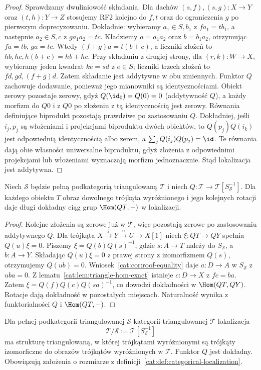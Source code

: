 \begin{proof}
Sprawdzamy dwuliniowość składania. Dla dachów $(s,f),(s,g):X\to Y$ oraz $(t,h):Y\to Z$ stosujemy RF2 kolejno do $f,t$ oraz do ograniczenia $g$ po pierwszym doprecyzowaniu. Dokładnie: wybieramy $a_1\in S,b_1$ z $fa_1=tb_1$, a następnie $a_2\in S,c$ z $ga_1a_2=tc$. Kładziemy $a=a_1a_2$ oraz $b=b_1a_2$, otrzymując $fa=tb$, $ga=tc$. Wtedy $(f+g)a=t(b+c)$, a liczniki złożeń to $hb,hc,h(b+c)=hb+hc$. Przy składaniu z drugiej strony, dla $(r,k):W\to X$, wybieramy jeden kwadrat $ke=sd$ z $e\in S$; liczniki trzech złożeń to $fd,gd,(f+g)d$. Zatem składanie jest addytywne w obu zmiennych. Funktor $Q$ zachowuje dodawanie, ponieważ jego mianowniki są identycznościami. Obiekt zerowy pozostaje zerowy, gdyż $Q(\id_0)=Q(0)=0$ (addytywność $Q$), a każdy morfizm do $Q0$ i z $Q0$ po złożeniu z tą identycznością jest zerowy. Równania definiujące biprodukt pozostają prawdziwe po zastosowaniu $Q$. Dokładniej, jeśli $i_j,p_j$ są włożeniami i projekcjami biproduktu dwóch obiektów, to $Q(p_j)Q(i_k)$ jest odpowiednią identycznością albo zerem, a $\sum_j Q(i_j)Q(p_j)=\id$. Te równania dają obie własności uniwersalne biproduktu, gdyż złożenia z odpowiednimi projekcjami lub włożeniami wyznaczają morfizm jednoznacznie. Stąd lokalizacja jest addytywna.
\end{proof}
\begin{lemat}\label{cat:lem:localized-hom-exact}
Niech $\mathcal S$ będzie pełną podkategorią triangulowaną $\mathcal T$ i niech $Q:\mathcal T\to\mathcal T[S_{\mathcal S}^{-1}]$. Dla każdego obiektu $T$ obraz dowolnego trójkąta wyróżnionego i jego kolejnych rotacji daje długi dokładny ciąg grup $\Hom(QT,-)$ w lokalizacji.
\end{lemat}
\begin{proof}
Kolejne złożenia są zerowe już w $\mathcal T$, więc pozostają zerowe po zastosowaniu addytywnego $Q$. Dla trójkąta $X\xrightarrow f Y\xrightarrow u U\to X[1]$ niech $\xi:QT\to QY$ spełnia $Q(u)\xi=0$. Piszemy $\xi=Q(b)Q(s)^{-1}$, gdzie $s:A\to T$ należy do $S_{\mathcal S}$, a $b:A\to Y$. Składając $Q(u)\xi=0$ z prawej strony z izomorfizmem $Q(s)$, otrzymujemy $Q(ub)=0$. Wniosek~\ref{cat:cor:roof-equality} daje $a:D\to A$ w $S_{\mathcal S}$ z $uba=0$. Z lematu~\ref{cat:lem:triangle-hom-exact} istnieje $c:D\to X$ z $fc=ba$. Zatem $\xi=Q(f)Q(c)Q(sa)^{-1}$, co dowodzi dokładności w $\Hom(QT,QY)$. Rotacje dają dokładność w pozostałych miejscach. Naturalność wynika z funktorialności $Q$ i $\Hom(QT,-)$.
\end{proof}
\begin{twierdzenie}\label{cat:thm:verdier-quotient}
Dla pełnej podkategorii triangulowanej $\mathcal S$ kategorii triangulowanej $\mathcal T$ lokalizacja
\[
 \mathcal T/\mathcal S:=\mathcal T[S_{\mathcal S}^{-1}]
\]
ma strukturę triangulowaną, w której trójkątami wyróżnionymi są trójkąty izomorficzne do obrazów trójkątów wyróżnionych w $\mathcal T$. Funktor $Q$ jest dokładny. Obowiązują założenia o rozmiarze z definicji~\ref{cat:def:categorical-localization}.
\end{twierdzenie}
